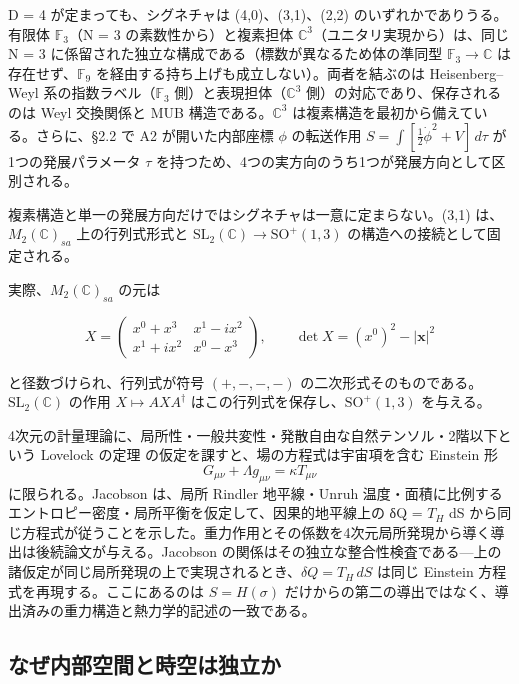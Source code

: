 \documentclass[fontsize=11pt,paper=a4,lualatex]{jlreq}
\begin{document}
D = 4 が定まっても、シグネチャは (4,0)、(3,1)、(2,2) のいずれかでありうる。有限体 $\mathbb{F}_3$（N = 3 の素数性から）と複素担体 $\mathbb{C}^3$（ユニタリ実現から）は、同じ N = 3 に係留された独立な構成である（標数が異なるため体の準同型 $\mathbb{F}_3 \to \mathbb{C}$ は存在せず、$\mathbb{F}_9$ を経由する持ち上げも成立しない）。両者を結ぶのは Heisenberg--Weyl 系の指数ラベル（$\mathbb{F}_3$ 側）と表現担体（$\mathbb{C}^3$ 側）の対応であり、保存されるのは Weyl 交換関係と MUB 構造である。$\mathbb{C}^3$ は複素構造を最初から備えている。さらに、§2.2 で A2 が開いた内部座標 $\phi$ の転送作用 $S = \int[\tfrac{1}{2}\dot{\phi}^2 + V]\,d\tau$ が1つの発展パラメータ $\tau$ を持つため、4つの実方向のうち1つが発展方向として区別される。

複素構造と単一の発展方向だけではシグネチャは一意に定まらない。(3,1) は、$M_2(\mathbb{C})_{sa}$ 上の行列式形式と $\mathrm{SL}_2(\mathbb{C}) \to \mathrm{SO}^+(1,3)$ の構造への接続として固定される。

実際、$M_2(\mathbb{C})_{sa}$ の元は

\[X = \begin{pmatrix} x^0 + x^3 & x^1 - i x^2 \\ x^1 + i x^2 & x^0 - x^3 \end{pmatrix},\qquad \det X = (x^0)^2 - |\boldsymbol{x}|^2\]

と径数づけられ、行列式が符号 $(+,-,-,-)$ の二次形式そのものである。$\mathrm{SL}_2(\mathbb{C})$ の作用 $X \mapsto AXA^\dagger$ はこの行列式を保存し、$\mathrm{SO}^+(1,3)$ を与える。

4次元の計量理論に、局所性・一般共変性・発散自由な自然テンソル・2階以下という Lovelock の定理 \cite{lovelock}
の仮定を課すと、場の方程式は宇宙項を含む Einstein 形
\[G_{\mu\nu} + \Lambda g_{\mu\nu} = \kappa T_{\mu\nu}\]
に限られる。Jacobson \cite{jacobson}
は、局所 Rindler 地平線・Unruh 温度・面積に比例するエントロピー密度・局所平衡を仮定して、因果的地平線上の δQ = $T_H$ dS
から同じ方程式が従うことを示した。重力作用とその係数を4次元局所発現から導く導出は後続論文が与える。Jacobson の関係はその独立な整合性検査である---上の諸仮定が同じ局所発現の上で実現されるとき、$\delta Q = T_H\,dS$ は同じ Einstein 方程式を再現する。ここにあるのは $S = H(\sigma)$ だけからの第二の導出ではなく、導出済みの重力構造と熱力学的記述の一致である。

\subsection{なぜ内部空間と時空は独立か}\label{ux306aux305cux5185ux90e8ux7a7aux9593ux3068ux6642ux7a7aux306fux72ecux7acbux304b}
\end{document}

